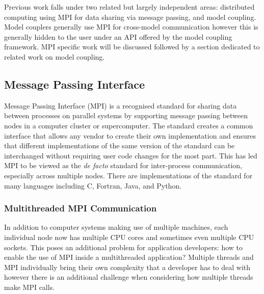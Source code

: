 \documentclass{acm_proc_article-sp}
\begin{document}
Previous work falls under two related but largely independent areas: distributed
computing using MPI for data sharing via message passing, and model coupling.
Model couplers generally use MPI for cross-model communication however this is
generally hidden to the user under an API offered by the model coupling
framework. MPI specific work will be discussed followed by a section dedicated
to related work on model coupling.

\subsection*{Message Passing Interface}

Message Passing Interface (MPI) is a recognised standard for sharing data
between processes on parallel systems by supporting message passing between
nodes in a computer cluster or supercomputer. The standard creates a common
interface that allows any vendor to create their own implementation and ensures
that different implementations of the same version of the standard can be
interchanged without requiring user code changes for the most part. This has led
MPI to be viewed as the \textit{de facto} standard for inter-process
communication, especially across multiple nodes. There are implementations of
the standard for many languages including C, Fortran, Java, and Python.

\subsubsection*{Multithreaded MPI Communication}

In addition to computer systems making use of multiple machines, each individual
node now has multiple CPU cores and sometimes even multiple CPU sockets. This
poses an additional problem for application developers: how to enable the use of
MPI inside a multithreaded application? Multiple threads and MPI individually
bring their own complexity that a developer has to deal with however there is an
additional challenge when considering how multiple threads make MPI calls.
\end{document}

